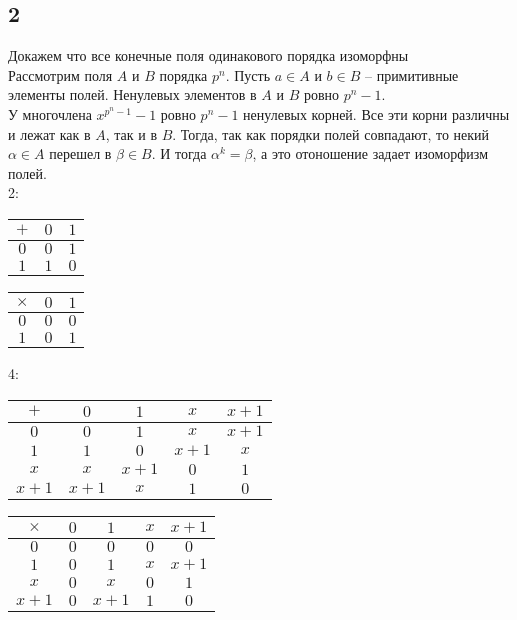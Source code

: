 		
		\subsection{2}
		Докажем что все конечные поля одинакового порядка изоморфны\\
		Рассмотрим поля $A$ и $B$ порядка $p^n$. Пусть $a \in A$ и $b \in B$ -- примитивные элементы полей. Ненулевых элементов в $A$ и $B$ ровно $p^n - 1$. \\
		У многочлена $x^{p^n - 1} - 1$ ровно $p^n - 1$ ненулевых корней. Все эти корни различны и лежат как в $A$, так и в $B$. Тогда, так как порядки полей совпадают, то некий $\alpha \in A$ перешел в $\beta \in B$. И тогда $\alpha^k = \beta$, а это отоношение задает изоморфизм полей.
		\\
		2:
		\begin{center}
			\begin{tabular}{|c|c|c|}
				\hline
				$+ $&$ 0 $&$ 1 $\\
				\hline
				$0 $&$ 0 $&$ 1 $\\
				\hline
				$1 $&$ 1 $&$ 0 $\\
				\hline
			\end{tabular}
		\end{center}
		\begin{center}
			\begin{tabular}{|c|c|c|}
				\hline
				$\times $&$ 0 $&$ 1 $\\
				\hline
				$0 $&$ 0 $&$ 0 $\\
				\hline
				$1 $&$ 0 $&$ 1 $\\
				\hline
			\end{tabular}
		\end{center}		
		4:
		\begin{center}
			\begin{tabular}{|c|c|c|c|c|}
				\hline
				$+ $&$ 0 $&$ 1 $&$ x $&$ x+1 $\\
				\hline
				$0 $&$ 0 $&$ 1 $&$ x $&$ x+1$\\
				\hline
				$1 $&$ 1 $&$ 0 $&$ x+1 $&$ x$\\
				\hline
				$x $&$ x $&$ x+1 $&$ 0 $&$ 1$\\
				\hline
				$x+1 $&$ x+1 $&$ x $&$ 1 $&$ 0$\\
				\hline
			\end{tabular}
		\end{center}
		\begin{center}
			\begin{tabular}{|c|c|c|c|c|}
				\hline
				$\times $&$ 0 $&$ 1 $&$ x $&$ x+1 $\\
				\hline
				$0 $&$ 0 $&$ 0 $&$ 0 $&$ 0$\\
				\hline
				$1 $&$ 0 $&$ 1 $&$ x $&$ x+1$\\
				\hline
				$x $&$ 0 $&$ x $&$ 0 $&$ 1$\\
				\hline
				$x+1 $&$ 0 $&$ x+1 $&$ 1 $&$ 0$\\
				\hline
			\end{tabular}
		\end{center}	
